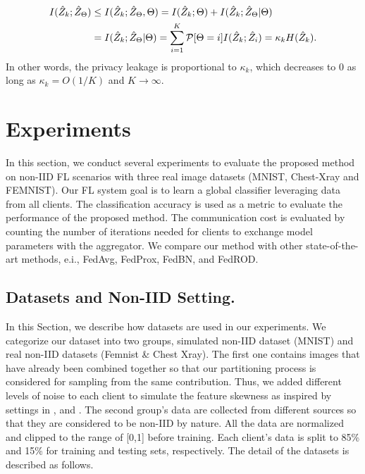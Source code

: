 \begin{equation}
\begin{aligned}
I({\hat Z}_k;{\hat Z}_\Theta) & \leq I({\hat Z}_k;{\hat Z}_\Theta, \Theta)
=  I({\hat Z}_k; \Theta) + I({\hat Z}_k;{\hat Z}_\Theta | \Theta)
\\ &= I({\hat Z}_k;{\hat Z}_\Theta | \Theta) = \sum_{i=1}^K \mathcal{P}[\Theta = i] I({\hat Z}_k;{\hat Z}_i) = \kappa_k H({\hat Z}_k).
\end{aligned}
\end{equation}
%
In other words, the privacy leakage is proportional to $\kappa_k$, which decreases to $0$ as long as $\kappa_k = O(1/K)$ and $K \rightarrow \infty$.

\section{Experiments}
\label{sec:FedExperiments}
In this section, we conduct several experiments to evaluate the proposed method on non-IID FL scenarios with three real image datasets (MNIST, Chest-Xray and FEMNIST). Our FL system goal is to learn a global classifier leveraging data from all clients. The classification accuracy is used as a metric to evaluate the performance of the proposed method. The communication cost is evaluated by counting the number of iterations needed for clients to exchange model parameters with the aggregator. We compare our method with other state-of-the-art methods, e.i., FedAvg, FedProx, FedBN, and FedROD. 

\subsection{Datasets and Non-IID Setting.}
In this Section, we describe how datasets are used in our experiments. We categorize our dataset into two groups, simulated non-IID dataset (MNIST) and real non-IID datasets (Femnist \& Chest Xray). The first one contains images that have already been combined together so that our partitioning process is considered for sampling from the same contribution. Thus, we added different levels of noise to each client to simulate the feature skewness as inspired by settings in \cite{abs-2102-02079}, and \cite{FedProto}. The second group's data are collected from different sources so that they are considered to be non-IID by nature. All the data are normalized and clipped to the range of [0,1] before training. Each client's data is split to 85\% and 15\% for training and testing sets, respectively. The detail of the datasets is described as follows.  

